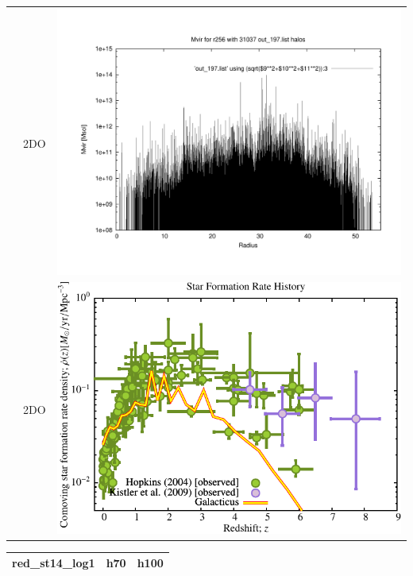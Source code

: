\documentclass[a4paper,11pt,fleqn,oneside]{book}
\begin{document}
\begin{itemize}
\begin{table}[p]
\begin{tabular}{l|c|c}
 & 2DO & \includegraphics[scale=0.25]{r256/h100/stages14_ling/plot_mvir_out_197.pdf} \\
 & 2DO & \includegraphics[scale=0.5]{r256/h100/stages14_ling/Plot_Star_Formation_History.pdf} \\
\end{tabular}
\end{table}
\begin{table}[p]
\centering
\begin{tabular}{l|c|c}
red\_st14\_log1 & h70 & h100 \\
\hline 

\end{tabular}
\end{table}
\end{itemize}
\end{document}

